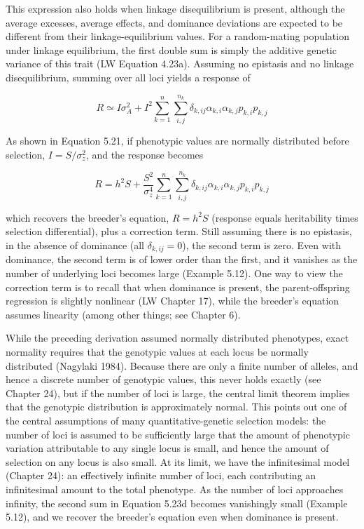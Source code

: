 \documentclass{article}
\begin{document}
This expression also holds when linkage disequilibrium is present, although the average excesses, average effects, and dominance deviations are expected to be different from their linkage-equilibrium values. For a random-mating population under linkage equilibrium, the first double sum is simply the additive genetic variance of this trait (LW Equation 4.23a). Assuming no epistasis and no linkage disequilibrium, summing over all loci yields a response of

\begin{equation}
R\simeq I\sigma_{A}^{2}+I^{2}\sum_{k=1}^{n}\sum_{i,j}^{n_{k}}\delta_{k,i j}\alpha_{k,i}\alpha_{k,j}p_{k,i}p_{k,j}
\tag{5.23c}
\label{eq:5_23c}
\end{equation}

As shown in Equation 5.21, if phenotypic values are normally distributed before selection,  $ I = S/\sigma_{z}^{2} $, and the response becomes

\begin{equation}
R=h^{2}S+\frac{S^{2}}{\sigma_{z}^{4}}\sum_{k=1}^{n}\sum_{i,j}^{n_{k}}\delta_{k,i j}\alpha_{k,i}\alpha_{k,j}p_{k,i}p_{k,j}
\tag{5.23d}
\label{eq:5_23d}
\end{equation}

which recovers the breeder's equation,  $ R = h^2 S $ (response equals heritability times selection differential), plus a correction term. Still assuming there is no epistasis, in the absence of dominance (all  $ \delta_{k,ij} = 0 $), the second term is zero. Even with dominance, the second term is of lower order than the first, and it vanishes as the number of underlying loci becomes large (Example 5.12). One way to view the correction term is to recall that when dominance is present, the parent-offspring regression is slightly nonlinear (LW Chapter 17), while the breeder's equation assumes linearity (among other things; see Chapter 6).

While the preceding derivation assumed normally distributed phenotypes, exact normality requires that the genotypic values at each locus be normally distributed (Nagylaki 1984). Because there are only a finite number of alleles, and hence a discrete number of genotypic values, this never holds exactly (see Chapter 24), but if the number of loci is large, the central limit theorem implies that the genotypic distribution is approximately normal. This points out one of the central assumptions of many quantitative-genetic selection models: the number of loci is assumed to be sufficiently large that the amount of phenotypic variation attributable to any single locus is small, and hence the amount of selection on any locus is also small. At its limit, we have the infinitesimal model (Chapter 24): an effectively infinite number of loci, each contributing an infinitesimal amount to the total phenotype. As the number of loci approaches infinity, the second sum in Equation 5.23d becomes vanishingly small (Example 5.12), and we recover the breeder's equation even when dominance is present.
\end{document}

